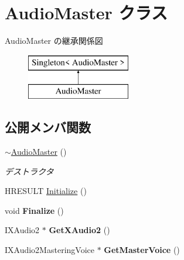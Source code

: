 \hypertarget{class_d3_d11_1_1_sound_1_1_audio_master}{}\section{Audio\+Master クラス}
\label{class_d3_d11_1_1_sound_1_1_audio_master}
Audio\+Master の継承関係図\begin{figure}[H]
\begin{center}
\leavevmode
\includegraphics[height=2.000000cm]{class_d3_d11_1_1_sound_1_1_audio_master}
\end{center}
\end{figure}
\subsection*{公開メンバ関数}
\begin{DoxyCompactItemize}
\item 
\hyperlink{class_d3_d11_1_1_sound_1_1_audio_master_ac052375f8aaaff706b536d84234181af}{$\sim$\+Audio\+Master} ()\hypertarget{class_d3_d11_1_1_sound_1_1_audio_master_ac052375f8aaaff706b536d84234181af}{}\label{class_d3_d11_1_1_sound_1_1_audio_master_ac052375f8aaaff706b536d84234181af}

\begin{DoxyCompactList}\small\item\em デストラクタ \end{DoxyCompactList}\item 
H\+R\+E\+S\+U\+LT \hyperlink{class_d3_d11_1_1_sound_1_1_audio_master_a81109341187e54cc3585f29a1306ca50}{Initialize} ()
\item 
void {\bfseries Finalize} ()\hypertarget{class_d3_d11_1_1_sound_1_1_audio_master_a8fee61d7a783cade1a3d07fe86284d27}{}\label{class_d3_d11_1_1_sound_1_1_audio_master_a8fee61d7a783cade1a3d07fe86284d27}

\item 
I\+X\+Audio2 $\ast$ {\bfseries Get\+X\+Audio2} ()\hypertarget{class_d3_d11_1_1_sound_1_1_audio_master_a3cdb0063c2593b2f7639db7a9a724fab}{}\label{class_d3_d11_1_1_sound_1_1_audio_master_a3cdb0063c2593b2f7639db7a9a724fab}

\item 
I\+X\+Audio2\+Mastering\+Voice $\ast$ {\bfseries Get\+Master\+Voice} ()\hypertarget{class_d3_d11_1_1_sound_1_1_audio_master_a608d3dee26595f2a6ee1694e06259a16}{}\label{class_d3_d11_1_1_sound_1_1_audio_master_a608d3dee26595f2a6ee1694e06259a16}

\end{DoxyCompactItemize}
